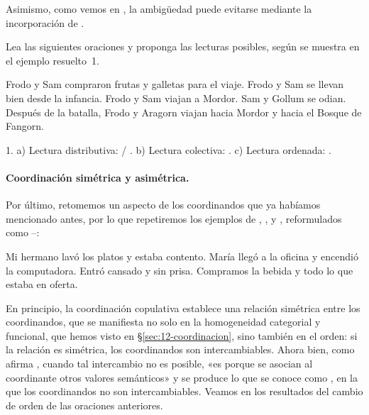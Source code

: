 Asimismo, como vemos en , la ambigüedad puede evitarse
mediante la incorporación de .

\begin{ejercicio}\label{ej:12-lecturas}
Lea las siguientes oraciones y proponga las lecturas posibles, según se muestra
en el ejemplo resuelto~1.

\begin{exe}
  \ex Frodo y Sam compraron frutas y galletas para el viaje.
  \ex Frodo y Sam se llevan bien desde la infancia.
  \ex Frodo y Sam viajan a Mordor.
  \ex Sam y Gollum se odian.
  \ex Después de la batalla, Frodo y Aragorn viajan hacia Mordor y hacia el
      Bosque de Fangorn.
\end{exe}

\begin{resuelto}
1. a) Lectura distributiva:  / . b) Lectura colectiva: . c) Lectura ordenada: .
\end{resuelto}
\end{ejercicio}

\paragraph{Coordinación simétrica y asimétrica.}\label{sec:12-simetrica}
Por último, retomemos un aspecto de los coordinandos que ya habíamos mencionado
antes, por lo que repetiremos los ejemplos de ,
,  y , reformulados
como --:

\begin{exe}
  \ex
    \begin{xlist}
      \ex\label{ex:12-sim-a} Mi hermano lavó los platos y estaba contento.
      \ex María llegó a la oficina y encendió la computadora.
      \ex Entró cansado y sin prisa.
      \ex\label{ex:12-sim-d} Compramos la bebida y todo lo que estaba en oferta.
    \end{xlist}
\end{exe}

En principio, la coordinación copulativa establece una relación simétrica entre
los coordinandos, que se manifiesta no solo en la homogeneidad categorial y
funcional, que hemos visto en §\ref{sec:12-coordinacion}, sino también en el
orden: si la relación es simétrica, los coordinandos son intercambiables. Ahora
bien, como afirma \textcite[282]{ditullio2014}, cuando tal intercambio no es
posible, «es porque se asocian al coordinante otros valores semánticos» y se
produce lo que se conoce como , en la que los
coordinandos no son intercambiables. Veamos en  los resultados
del cambio de orden de las oraciones anteriores.

